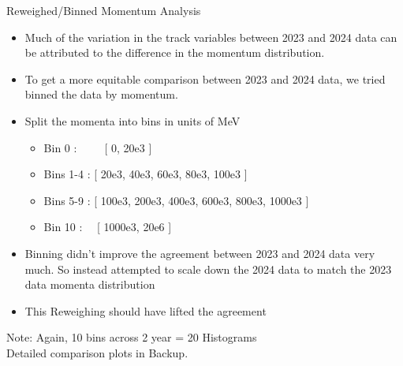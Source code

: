 \begin{frame}{Reweighed/Binned Momentum Analysis}
    \begin{itemize}
        \item Much of the variation in the track variables between 2023 and 2024 data can be attributed to the difference in the momentum distribution.
        \item To get a more equitable comparison between 2023 and 2024 data, we tried binned the data by momentum.
        \item Split the momenta into bins in units of MeV
        \begin{itemize}
            \item Bin 0 :\ \ \ \ \   [ 0, 20e3 ]
            \item Bins 1-4 : [ 20e3, 40e3, 60e3, 80e3, 100e3 ]
            \item Bins 5-9 :   [ 100e3, 200e3, 400e3, 600e3, 800e3, 1000e3 ]
            \item Bin 10 : \ \ [ 1000e3, 20e6 ]
        \end{itemize}
        \item Binning didn't improve the agreement between 2023 and 2024 data very much. So instead attempted to scale down the 2024 data to match the 2023 data momenta distribution
        \item This Reweighing should have lifted the agreement
    \end{itemize}
    \vspace{0.2cm}
    \small{    
        Note: Again, 10 bins across 2 year = 20 Histograms \\
        Detailed comparison plots in Backup.
    }
\end{frame}

